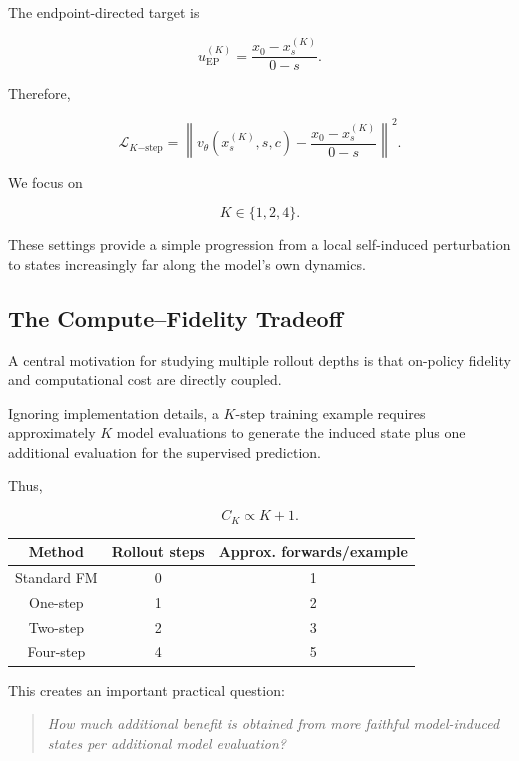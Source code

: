 \documentclass[11pt]{article}
\begin{document}
The endpoint-directed target is

\begin{equation}
u_{\mathrm{EP}}^{(K)}
=
\frac{x_0-x_s^{(K)}}{0-s}.
\end{equation}

Therefore,

\begin{equation}
\boxed{
\mathcal{L}_{K\mathrm{-step}}
=
\left\|
v_\theta(x_s^{(K)},s,c)
-
\frac{x_0-x_s^{(K)}}{0-s}
\right\|^2.
}
\end{equation}

We focus on

\begin{equation}
K\in\{1,2,4\}.
\end{equation}

These settings provide a simple progression from a local self-induced
perturbation to states increasingly far along the model's own dynamics.

\subsection{The Compute--Fidelity Tradeoff}

A central motivation for studying multiple rollout depths is that on-policy
fidelity and computational cost are directly coupled.

Ignoring implementation details, a $K$-step training example requires
approximately $K$ model evaluations to generate the induced state plus one
additional evaluation for the supervised prediction.

Thus,

\begin{equation}
C_K \propto K+1.
\end{equation}

\begin{center}
\begin{tabular}{c c c}
\toprule
Method & Rollout steps & Approx. forwards/example \\
\midrule
Standard FM & 0 & 1 \\
One-step & 1 & 2 \\
Two-step & 2 & 3 \\
Four-step & 4 & 5 \\
\bottomrule
\end{tabular}
\end{center}

This creates an important practical question:

\begin{quote}
\emph{How much additional benefit is obtained from more faithful model-induced
states per additional model evaluation?}
\end{quote}
\end{document}
